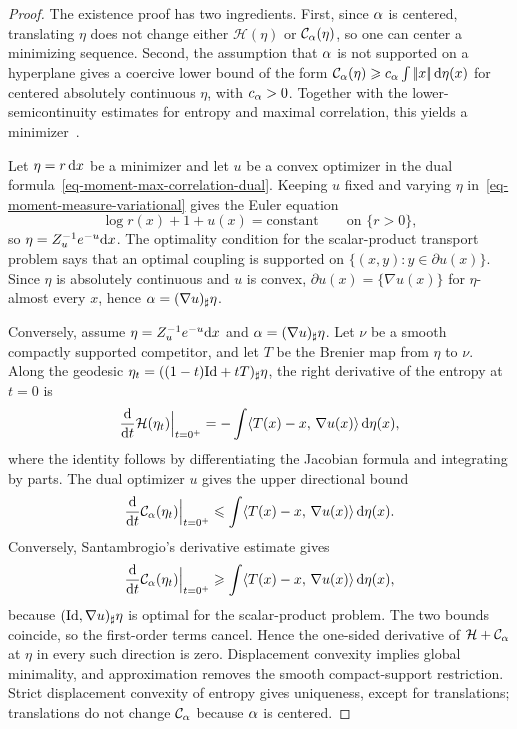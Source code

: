 \begin{proof}
	The existence proof has two ingredients. First, since $\alpha$ is centered, translating $\eta$ does not change either $\mathcal H(\eta)$ or $\mathcal C_\alpha(\eta)$, so one can center a minimizing sequence. Second, the assumption that $\alpha$ is not supported on a hyperplane gives a coercive lower bound of the form $\mathcal C_\alpha(\eta)\geqslant c_\alpha\int|\!| x |\!|\,\mathrm{d}\eta(x)$ for centered absolutely continuous $\eta$, with $c_\alpha>0$. Together with the lower-semicontinuity estimates for entropy and maximal correlation, this yields a minimizer~\cite{Santambrogio2015MomentMeasures}.

	Let $\eta=r\,\mathrm{d} x$ be a minimizer and let $u$ be a convex optimizer in the dual formula~\eqref{eq-moment-max-correlation-dual}. Keeping $u$ fixed and varying $\eta$ in~\eqref{eq-moment-measure-variational} gives the Euler equation
	\[
		\log r(x)+1+u(x)=\mathrm{constant}
		\qquad\text{on }\{r>0\},
	\]
	so $\eta=Z_u^{-1}e^{-u}\mathrm{d} x$. The optimality condition for the scalar-product transport problem says that an optimal coupling is supported on $\{(x,y):y\in\partial u(x)\}$. Since $\eta$ is absolutely continuous and $u$ is convex, $\partial u(x)=\{\nabla u(x)\}$ for $\eta$-almost every $x$, hence $\alpha=(\nabla u)_\sharp\eta$.

	Conversely, assume $\eta=Z_u^{-1}e^{-u}\mathrm{d} x$ and $\alpha=(\nabla u)_\sharp\eta$. Let $\nu$ be a smooth compactly supported competitor, and let $T$ be the Brenier map from $\eta$ to $\nu$. Along the geodesic $\eta_t=((1-t)\mathrm{Id}+tT)_\sharp\eta$, the right derivative of the entropy at $t=0$ is
	\[
		\frac{\mathrm{d}}{\mathrm{d} t}\mathcal H(\eta_t)\Big|_{t=0^+}
		=
		-\int \langle T(x)-x,\,\nabla u(x)\rangle\,\mathrm{d}\eta(x),
	\]
	where the identity follows by differentiating the Jacobian formula and integrating by parts. The dual optimizer $u$ gives the upper directional bound
	\[
		\frac{\mathrm{d}}{\mathrm{d} t}\mathcal C_\alpha(\eta_t)\Big|_{t=0^+}
		\leqslant
		\int \langle T(x)-x,\,\nabla u(x)\rangle\,\mathrm{d}\eta(x).
	\]
	Conversely, Santambrogio's derivative estimate gives
	\[
		\frac{\mathrm{d}}{\mathrm{d} t}\mathcal C_\alpha(\eta_t)\Big|_{t=0^+}
		\geqslant
		\int \langle T(x)-x,\,\nabla u(x)\rangle\,\mathrm{d}\eta(x),
	\]
	because $(\mathrm{Id},\nabla u)_\sharp\eta$ is optimal for the scalar-product problem. The two bounds coincide, so the first-order terms cancel. Hence the one-sided derivative of $\mathcal H+\mathcal C_\alpha$ at $\eta$ in every such direction is zero. Displacement convexity implies global minimality, and approximation removes the smooth compact-support restriction. Strict displacement convexity of entropy gives uniqueness, except for translations; translations do not change $\mathcal C_\alpha$ because $\alpha$ is centered.


\end{proof}
